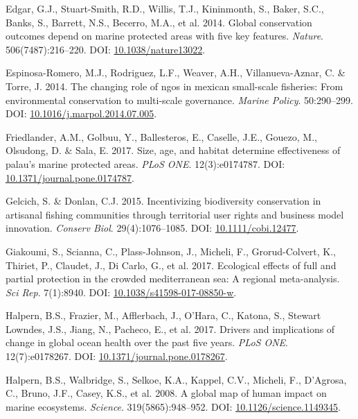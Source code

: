 \documentclass[12pt,]{article}
\begin{document}
\hypertarget{ref-edgar_2014-UO}{}
Edgar, G.J., Stuart-Smith, R.D., Willis, T.J., Kininmonth, S., Baker,
S.C., Banks, S., Barrett, N.S., Becerro, M.A., et al. 2014. Global
conservation outcomes depend on marine protected areas with five key
features. \emph{Nature}. 506(7487):216--220. DOI:
\href{https://doi.org/10.1038/nature13022}{10.1038/nature13022}.

\hypertarget{ref-espinosaromero_2014-PY}{}
Espinosa-Romero, M.J., Rodriguez, L.F., Weaver, A.H., Villanueva-Aznar,
C. \& Torre, J. 2014. The changing role of ngos in mexican small-scale
fisheries: From environmental conservation to multi-scale governance.
\emph{Marine Policy}. 50:290--299. DOI:
\href{https://doi.org/10.1016/j.marpol.2014.07.005}{10.1016/j.marpol.2014.07.005}.

\hypertarget{ref-friedlander_2017-oI}{}
Friedlander, A.M., Golbuu, Y., Ballesteros, E., Caselle, J.E., Gouezo,
M., Olsudong, D. \& Sala, E. 2017. Size, age, and habitat determine
effectiveness of palau's marine protected areas. \emph{PLoS ONE}.
12(3):e0174787. DOI:
\href{https://doi.org/10.1371/journal.pone.0174787}{10.1371/journal.pone.0174787}.

\hypertarget{ref-gelcich_2015-Gw}{}
Gelcich, S. \& Donlan, C.J. 2015. Incentivizing biodiversity
conservation in artisanal fishing communities through territorial user
rights and business model innovation. \emph{Conserv Biol}.
29(4):1076--1085. DOI:
\href{https://doi.org/10.1111/cobi.12477}{10.1111/cobi.12477}.

\hypertarget{ref-giakoumi_2017-V2}{}
Giakoumi, S., Scianna, C., Plass-Johnson, J., Micheli, F.,
Grorud-Colvert, K., Thiriet, P., Claudet, J., Di Carlo, G., et al. 2017.
Ecological effects of full and partial protection in the crowded
mediterranean sea: A regional meta-analysis. \emph{Sci Rep}. 7(1):8940.
DOI:
\href{https://doi.org/10.1038/s41598-017-08850-w}{10.1038/s41598-017-08850-w}.

\hypertarget{ref-halpern_2017-Zi}{}
Halpern, B.S., Frazier, M., Afflerbach, J., O'Hara, C., Katona, S.,
Stewart Lowndes, J.S., Jiang, N., Pacheco, E., et al. 2017. Drivers and
implications of change in global ocean health over the past five years.
\emph{PLoS ONE}. 12(7):e0178267. DOI:
\href{https://doi.org/10.1371/journal.pone.0178267}{10.1371/journal.pone.0178267}.

\hypertarget{ref-halpern_2008-dK}{}
Halpern, B.S., Walbridge, S., Selkoe, K.A., Kappel, C.V., Micheli, F.,
D'Agrosa, C., Bruno, J.F., Casey, K.S., et al. 2008. A global map of
human impact on marine ecosystems. \emph{Science}. 319(5865):948--952.
DOI:
\href{https://doi.org/10.1126/science.1149345}{10.1126/science.1149345}.
\end{document}

